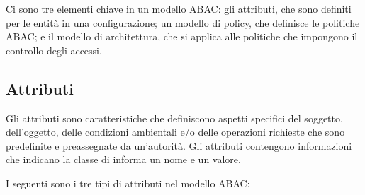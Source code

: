 \singlespacing

Ci sono tre elementi chiave in un modello ABAC: gli attributi, che sono definiti per le entità in una configurazione; un modello di policy, che definisce le politiche ABAC; e il modello di architettura, che si applica alle politiche che impongono il controllo degli accessi.

\newpage

\subsection{Attributi}
Gli attributi sono caratteristiche che definiscono aspetti specifici del soggetto, dell'oggetto, delle condizioni ambientali e/o delle operazioni richieste che sono predefinite e preassegnate da un'autorità. Gli attributi contengono informazioni che indicano la classe di informa un nome e un valore.

\singlespacing

I seguenti sono i tre tipi di attributi nel modello ABAC:

